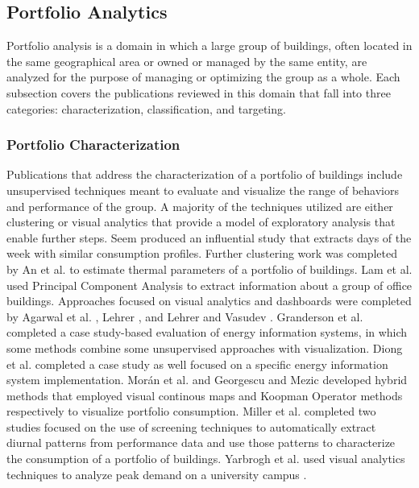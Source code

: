 \subsection{Portfolio Analytics}
\label{PortfolioAnalytics}

Portfolio analysis is a domain in which a large group of buildings, often located in the same geographical area or owned or managed by the same entity, are analyzed for the purpose of managing or optimizing the group as a whole. Each subsection covers the publications reviewed in this domain that fall into three categories: characterization, classification, and targeting.

\subsubsection{Portfolio Characterization}
Publications that address the characterization of a portfolio of buildings include unsupervised techniques meant to evaluate and visualize the range of behaviors and performance of the group. A majority of the techniques utilized are either clustering or visual analytics that provide a model of exploratory analysis that enable further steps. Seem \cite{seem_pattern_2005} produced an influential study that extracts days of the week with similar consumption profiles. Further clustering work was completed by An et al. \cite{an_estimation_2012} to estimate thermal parameters of a portfolio of buildings. Lam et al. \cite{lam_principal_2008} used Principal Component Analysis to extract information about a group of office buildings. Approaches focused on visual analytics and dashboards were completed by Agarwal et al. \cite{agarwal_energy_2009}, Lehrer \cite{lehrer_research_2009}, and Lehrer and Vasudev \cite{lehrer_visualizing_2011}. Granderson et al. \cite{granderson_building_2010} completed a case study-based evaluation of energy information systems, in which some methods combine some unsupervised approaches with visualization. Diong et al. \cite{diong_establishing_2015} completed a case study as well focused on a specific energy information system implementation. Mor\'an et al. \cite{moran_analysis_2013} and Georgescu and Mezic \cite{georgescu_site-level_2014} developed hybrid methods that employed visual continous maps and Koopman Operator methods respectively to visualize portfolio consumption. Miller et al. \cite{miller_forensically_2015,miller_automated_2015} completed two studies focused on the use of screening techniques to automatically extract diurnal patterns from performance data and use those patterns to characterize the consumption of a portfolio of buildings. Yarbrogh et al. used visual analytics techniques to analyze peak demand on a university campus \cite{yarbrough_visualizing_2015}.


